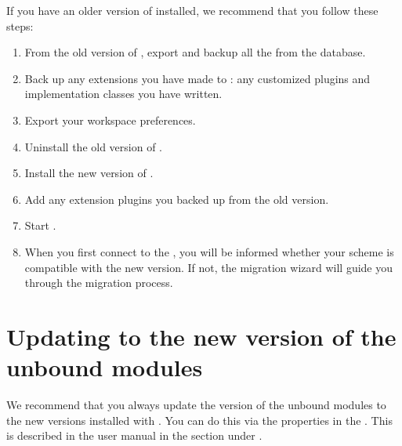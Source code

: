 If you have an older version of \app{} installed, we recommend that you follow these steps:

\begin{enumerate}
\item From the old version of \app{}, export and backup all the \gdprojects{} from the database. 
\item Back up any extensions you have made to \app{}: any customized plugins and implementation classes you have written.  
\item Export your workspace preferences.
\item Uninstall the old version of \app{}. 
\item Install the new version of \app{}.
\item Add any extension plugins you backed up from the old version.
\item Start \app{}.  
\item When you first connect to the \gddb{}, you will be informed whether your \gddb{} scheme is compatible with the new version. If not, the migration wizard will guide you through the migration process.

\end{enumerate}

\section{Updating to the new version of the unbound modules}
We recommend that you always update the version of the unbound modules \gdprojects{} to the new versions installed with \app{}. You can do this via the \gdproject{} properties in the \ite{}. This is described in the user manual in the  section under \bxname{\gdprojects{}}. 

